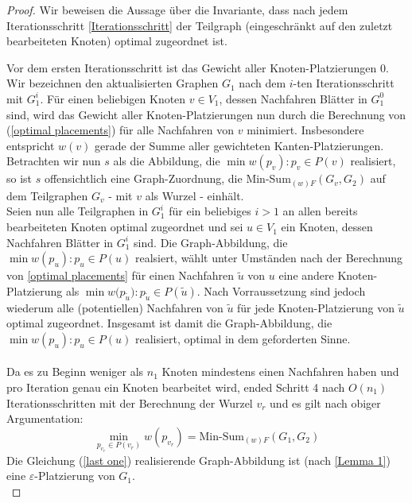 \documentclass[a4paper, 12pt, twoside]{article}
\theoremstyle{Format1} %
\begin{document}
\begin{proof}
Wir beweisen die Aussage über die Invariante, dass nach jedem Iterationsschritt \ref{Iterationsschritt} der Teilgraph (eingeschränkt auf
den zuletzt bearbeiteten Knoten) optimal zugeordnet ist.

Vor dem ersten Iterationsschritt ist das Gewicht aller Knoten-Platzierungen $0$.
Wir bezeichnen den aktualisierten Graphen $G_1$ nach dem $i$-ten Iterationsschritt mit $G_1^i$.
Für einen beliebigen Knoten $v \in V_1$, dessen Nachfahren Blätter in $G_1^0$ sind, wird das Gewicht aller Knoten-Platzierungen nun durch die Berechnung von (\ref{optimal placements})
für alle Nachfahren von $v$ minimiert. Insbesondere entspricht $w(v)$ gerade der Summe aller gewichteten Kanten-Platzierungen. Betrachten wir nun $s$ als die Abbildung, die $\min{w(p_v)}: p_v \in P(v)$ realisiert,
so ist $s$ offensichtlich eine Graph-Zuordnung, die Min-Sum$_{(w)F}(G_v, G_2)$ auf dem Teilgraphen $G_v$ - mit $v$ als Wurzel - einhält.
\\
Seien nun alle Teilgraphen in $G_1^i$ für ein beliebiges $i>1$ an allen bereits bearbeiteten Knoten optimal zugeordnet und sei $u \in V_1$ ein Knoten, dessen
Nachfahren Blätter in $G_1^i$ sind. Die Graph-Abbildung, die $\min{w(p_u)}: p_u \in P(u)$ realsiert, wählt unter Umständen nach der Berechnung von \ref{optimal placements}
für einen Nachfahren $\tilde{u}$ von $u$ eine andere Knoten-Platzierung als $\min{w(p_{\tilde{u}}}): p_{\tilde{u}} \in P(\tilde{u})$. Nach Vorraussetzung sind jedoch
wiederum alle (potentiellen) Nachfahren von $\tilde{u}$ für jede Knoten-Platzierung von $\tilde{u}$ optimal zugeordnet. Insgesamt ist damit die Graph-Abbildung, die $\min{w(p_u)}: p_u \in P(u)$ realisiert,
optimal in dem geforderten Sinne.
\\
\\
Da es zu Beginn weniger als $n_1$ Knoten mindestens einen Nachfahren haben und pro Iteration genau ein Knoten bearbeitet wird,
ended Schritt 4 nach $O(n_1)$ Iterationsschritten mit der Berechnung der Wurzel $v_r$ und es gilt nach obiger Argumentation:
\begin{equation}
	\min_{p_{v_r} \in P(v_r)}{w(p_{v_r})} = \text{Min-Sum}_{(w)F}(G_1,G_2) \label {last one}
\end{equation}
Die Gleichung (\ref{last one}) realisierende Graph-Abbildung ist (nach \ref{Lemma 1}) eine $\varepsilon$-Platzierung von $G_1$.
\\
\end{proof}
\end{document}
